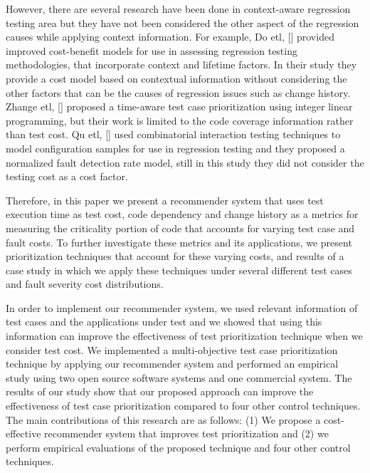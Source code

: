 However, there are several research have been done 
in context-aware regression testing area but they have not been considered the other
aspect of the regression causes while applying context information. 
For example, Do etl, [] provided improved cost-benefit models for use 
in assessing regression testing methodologies,
that incorporate context and lifetime factors. %
In their study they provide a cost model based on contextual information without 
considering the other factors that can be the causes of regression issues such as change history. 
Zhange etl, [] proposed a time-aware test case prioritization 
using integer linear programming, but their work is limited to the code coverage
information rather than test cost. Qu etl, [] used combinatorial interaction
testing techniques to model configuration samples for use in regression testing 
and they proposed a normalized fault detection rate model, still in this
study they did not consider the testing cost as a cost factor.   

Therefore, in this paper we present a 
recommender system that uses test execution time as test cost,  
code dependency and change history as a metrics for measuring 
the criticality portion of code that accounts for varying 
test case and fault costs. To further investigate these metrics 
and its applications, we present prioritization techniques that 
account for these varying costs, and results of a case study in 
which we apply these techniques under several different test cases 
and fault severity cost distributions.
 

In order to implement our recommender system, 
we used relevant information of 
test cases and the applications under test and we showed that using 
this information can improve the effectiveness of test prioritization 
technique when we consider test cost. We implemented a multi-objective test case 
prioritization technique by applying our recommender system and 
performed an empirical study using two open source software systems 
and one commercial system. The results of our study show that our 
proposed approach can improve the effectiveness of test case prioritization 
compared to four other control techniques. The main contributions of 
this research are as follows: (1) We propose a cost-effective 
recommender system that improves test prioritization and 
(2) we perform empirical evaluations of the proposed technique 
and four other control techniques.

